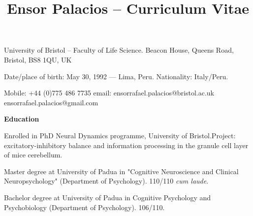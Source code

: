 \documentclass[11pt,usenames, dvipsnames]{article}
\title{\bfseries Ensor Palacios -- Curriculum Vitae}
\begin{document}
\date{\vspace{5ex}}   %
\maketitle
\vspace{-60pt}
\medskip

University of Bristol -- Faculty of Life Science.\newline
Beacon House, Queens Road, Bristol, BS8 1QU, UK\newline

Date/place of birth: May 30, 1992 --- Lima, Peru.\newline
Nationality: Italy/Peru.\newline

Mobile: +44 (0)775 486 7735\newline
email: ensorrafael.palacios@bristol.ac.uk\newline 
       ensorrafael.palacios@gmail.com\newline


\vspace{1cm}

{\large \bfseries Education}\newline
\vspace{-2pt}

 Enrolled in PhD Neural Dynamics programme, University of Bristol.\newline Project: excitatory-inhibitory balance and information processing in the granule cell layer of mice cerebellum.\newline
\vspace{-7pt}

 Master degree at University of Padua in "Cognitive Neuroscience and Clinical Neuropsychology" (Department of Psychology). 110/110 \emph{cum laude}.\newline
\vspace{-7pt}

 Bachelor degree at University of Padua in Cognitive Psychology and Psychobiology (Department of Psychology). 106/110.\newline
\vspace{-7pt}
\end{document}
